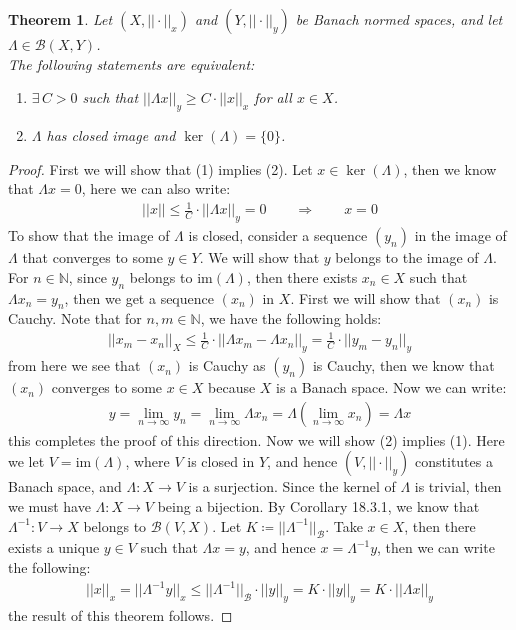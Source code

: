\documentclass[11pt]{book}
\theoremstyle{break}
\theoremstyle{break}
\newtheorem{thm}{Theorem}[section]
\newcommand{\N}{\mathbb{N}}
\newcommand{\im}{\text{im}}
\begin{document}
\begin{thm}
Let $(X,||\cdot ||_x)$ and $(Y,||\cdot ||_y)$ be Banach normed spaces, and let $\Lambda \in \mathcal{B}(X,Y)$. \\
The following statements are equivalent:
\begin{enumerate}[topsep=3pt,itemsep=-1ex,partopsep=1ex,parsep=1ex]
\item $\exists \, C>0$ such that $||\Lambda x||_y \geq C \cdot ||x||_x$  for all $x \in X$. 
\item $\Lambda$ has closed image and $\ker(\Lambda) = \{0\}$. 
\end{enumerate}
\end{thm}
\begin{proof}
First we will show that (1) implies (2). Let $x \in \ker(\Lambda)$, then we know that $\Lambda x = 0$, here we can also write:
\begin{align*}
||x|| \leq \frac{1}{C}\cdot ||\Lambda x||_y = 0 \qquad \Rightarrow \qquad x = 0
\end{align*}
To show that the image of $\Lambda$ is closed, consider a sequence $(y_n)$ in the image of $\Lambda$ that converges to some $y \in Y$. We will show that $y$ belongs to the image of $\Lambda$. For $n \in \N$, since $y_n$ belongs to $\im(\Lambda)$, then there exists $x_n \in X$ such that $\Lambda x_n = y_n$, then we get a sequence $(x_n)$ in $X$. First we will show that $(x_n)$ is Cauchy. Note that for $n,m \in \N$, we have the following holds:
\begin{align*}
||x_m - x_n||_X \leq \frac{1}{C}\cdot ||\Lambda x_m - \Lambda x_n||_y = \frac{1}{C}\cdot  ||y_m - y_n||_y
\end{align*}
from here we see that $(x_n)$ is Cauchy as $(y_n)$ is Cauchy, then we know that $(x_n)$ converges to some $x \in X$ because $X$ is a Banach space. Now we can write:
\begin{align*}
y=\lim_{n\to \infty}y_n = \lim_{n\to \infty} \Lambda x_n = \Lambda\left( \lim_{n \to \infty}x_n \right) = \Lambda x 
\end{align*}
this completes the proof of this direction. Now we will show (2) implies (1). Here we let $V = \im(\Lambda)$, where $V$ is closed in $Y$, and hence $(V, ||\cdot||_y)$ constitutes a Banach space, and $\Lambda : X \to V$ is a surjection. Since the kernel of $\Lambda$ is trivial, then we must have $\Lambda: X \to V$ being a bijection. By Corollary 18.3.1, we know that $\Lambda^{-1} : V \to X$ belongs to $\mathcal{B}(V,X)$. Let $K \coloneqq ||\Lambda^{-1}||_{\mathcal{B}}$. Take $x \in X$, then there exists a unique $y \in V$ such that $\Lambda  x = y$, and hence $x = \Lambda^{-1} y$, then we can write the following:
\begin{align*}
||x||_x = ||\Lambda^{-1}y ||_x \leq ||\Lambda^{-1}||_{\mathcal{B}}\cdot ||y||_y = K \cdot ||y||_y = K \cdot ||\Lambda x||_y
\end{align*}
the result of this theorem follows. 
\end{proof}
\end{document}
